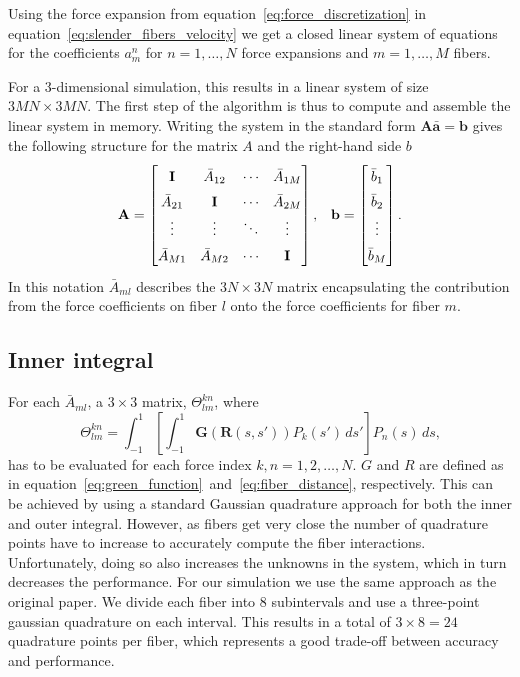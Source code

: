 Using the force expansion from equation~\ref{eq:force_discretization} in equation~\ref{eq:slender_fibers_velocity} we get a closed linear system of equations for the coefficients $a_{m}^{n}$ for $n=1,\dots,N$ force expansions and $m = 1,\dots,M$ fibers.

For a 3-dimensional simulation, this results in a linear system of size $3MN\times3MN$. The first step of the algorithm is thus to compute and assemble the linear system in memory. Writing the system in the standard form $\mathbf{A}\mathbf{\bar{a}}=\mathbf{b}$ gives the following structure for the matrix $A$ and the right-hand side $b$
\begin{equation}
  \label{eq:matrix_structure}
  \renewcommand\arraystretch{1.5}
  \mathbf{A} =
  \begin{bmatrix}
    \mathbf{I} & \bar{A}_{12} & \cdots & \bar{A}_{1M} \\
    \bar{A}_{21} & \mathbf{I} & \cdots & \bar{A}_{2M} \\
    \vdots & \vdots & \ddots & \vdots \\
    \bar{A}_{M1} & \bar{A}_{M2} & \cdots & \mathbf{I}
  \end{bmatrix} \text{,} \quad \mathbf{b} =
  \begin{bmatrix}
    \bar{b}_{1} \\
    \bar{b}_{2} \\
    \vdots \\
    \bar{b}_{M} \\
  \end{bmatrix} \text{.}
\end{equation}
In this notation $\bar{A}_{ml}$ describes the $3N\times3N$ matrix encapsulating the contribution from the force coefficients on fiber $l$ onto the force coefficients for fiber $m$.

\subsection{Inner integral}
\label{subsec:inner_integral}

For each $\bar{A}_{ml}$, a $3\times3$ matrix, $\Theta_{lm}^{kn}$, where
\begin{equation}
  \label{eq:inner_integral}
  \Theta_{lm}^{kn} = \int_{-1}^{1} \left[\int_{-1}^{1}\mathbf{G}(\mathbf{R}(s,s')) P_k(s') \, ds' \right]P_n(s) \, ds \text{,}
\end{equation}
has to be evaluated for each force index $k,n = 1,2,\dots,N$. $G$ and $R$ are defined as in equation~\eqref{eq:green_function}~and~\eqref{eq:fiber_distance}, respectively. This can be achieved by using a standard Gaussian quadrature approach for both the inner and outer integral. However, as fibers get very close the number of quadrature points have to increase to accurately compute the fiber interactions. Unfortunately, doing so also increases the unknowns in the system, which in turn decreases the performance. For our simulation we use the same approach as the original paper. We divide each fiber into 8 subintervals and use a three-point gaussian quadrature on each interval. This results in a total of $3 \times 8 = 24$ quadrature points per fiber, which represents a good trade-off between accuracy and performance.

